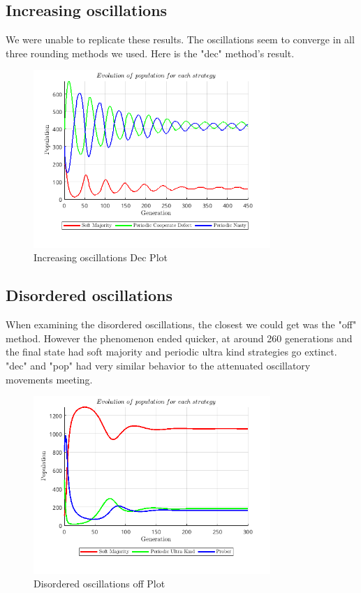 \documentclass[12pt]{article}
\begin{document}
\subsection{Increasing oscillations}
We were unable to replicate these results. The oscillations seem to converge in all three rounding methods we used. Here is the "dec" method's result.
\begin{figure}[H]
    \centering
    \includegraphics[width=0.8\textwidth]{media/increasing_oscillations_dec}
    \caption{Increasing oscillations Dec Plot}
\end{figure}

\subsection{Disordered oscillations}
When examining the disordered oscillations, the closest we could get was the "off" method. However the phenomenon ended quicker, at around 260 generations and the final state had soft majority and periodic ultra kind strategies go extinct. "dec" and "pop" had very similar behavior to the attenuated oscillatory movements meeting.
\begin{figure}[H]
    \centering
    \includegraphics[width=0.8\textwidth]{media/disordered_oscillations_off.png}
    \caption{Disordered oscillations off Plot}
\end{figure}
\end{document}
